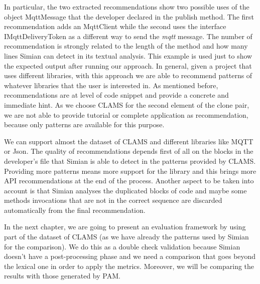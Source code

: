 In particular, the two extracted recommendations show two possible uses of the object MqttMessage that the developer declared in the publish method. The first recommendation adds an MqttClient while the second uses the interface IMqttDeliveryToken as a different way to send the \emph{mqtt} message. The number of recommendation is strongly related to the length of the method and how many lines Simian can detect in its textual analysis. This example is used just to show the expected output after running our approach. In general, given a project that uses different libraries, with this approach we are able to recommend patterns of whatever libraries that the user is interested in. As mentioned before, recommendations are at level of code snippet and provide a concrete and immediate hint. As we choose CLAMS for the second element of the clone pair, we are not able to provide tutorial or complete application as recommendation, because only patterns are available for this purpose.

We can support almost the dataset of CLAMS and different libraries like MQTT or Json. The quality of recommendations depends first of all on the blocks in the developer's file that Simian is able to detect in the patterns provided by CLAMS. Providing more patterns means more support for the library and this brings more API recommendations at the end of the process. Another aspect to be taken into account is that Simian analyses the duplicated blocks of code and maybe some methods invocations that are not in the correct sequence are discarded automatically from the final recommendation.

In the next chapter, we are going to present an evaluation framework by using part of the dataset of CLAMS (as we have already the patterns used by Simian for the comparison). We do this as a double check validation because Simian doesn't have a post-processing phase and we need a comparison that goes beyond the lexical one in order to apply the metrics. Moreover, we will be comparing the results with those generated by PAM.%




